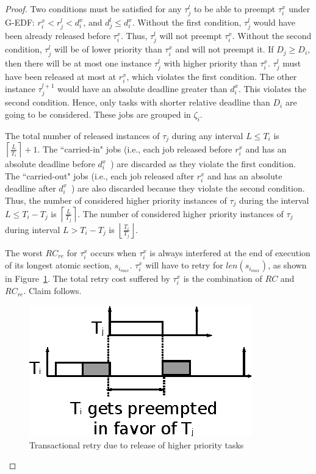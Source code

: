 \begin{proof}
Two conditions must be satisfied for any $\tau_{j}^{l}$ to be able to preempt
$\tau_{i}^{x}$ under G-EDF: $r_{i}^{x}<r_{j}^{l}<d_{i}^{x}$,
and $d_{j}^{l}\le d_{i}^{x}$. Without the first condition, $\tau_{j}^{l}$
would have been already released before $\tau_{i}^{x}$. Thus, $\tau_j^l$ will
not preempt $\tau_i^x$. Without the second condition, $\tau_{j}^{l}$ will
be of lower priority than $\tau_{i}^{x}$ and will not preempt it.
If $D_{j} \ge D_{i}$, then there will be at most one instance $\tau_j^l$ with higher priority than $\tau_{i}^{x}$. $\tau_j^l$ must have been released at most at $r_i^x$, which violates the first condition. The other instance $\tau_j^{l+1}$ would have an absolute deadline greater than $d_i^x$. This violates the second condition. Hence, only tasks with shorter relative deadline than $D_{i}$ are going to be considered. These jobs are grouped in $\zeta_i$.

The total number of released instances of $\tau_{j}$ during any interval $L\le T_{i}$ is $\left\lceil \frac{L}{T_{i}}\right\rceil +1$. The ``carried-in" jobs (i.e., each job released before $r_i^x$ and has an absolute deadline before $d_i^x$~\cite{key-2}) are discarded as they violate the first condition. The ``carried-out" jobs (i.e., each job released after $r_i^x$ and has an absolute deadline after $d_i^x$~\cite{key-2}) are also discarded because they violate the second condition. Thus, the number of considered higher priority instances of $\tau_j$ during the interval $L\le T_i-T_j$ is $\left\lceil\frac{L}{T_j}\right\rceil$. The number of considered higher priority instances of $\tau_j$ during interval $L> T_i-T_j$ is $\left\lfloor\frac{T_i}{T_j}\right\rfloor$.

The worst $RC_{re}$ for $\tau_i^x$ occurs when $\tau_i^x$ is always interfered at the end of execution of its longest atomic section, $s_{i_{max}}$. $\tau_i^x$ will have to retry for $len(s_{i_{max}})$, as shown in Figure~\ref{fig8}. The total retry cost suffered by $\tau_i^x$ is the combination of $RC$ and $RC_{re}$. Claim follows.

\begin{figure}
\centering{}\includegraphics[scale=0.7]{figures/figure8}\caption{\label{fig8}Transactional retry due to release of higher priority
tasks}
\end{figure}
\end{proof}

